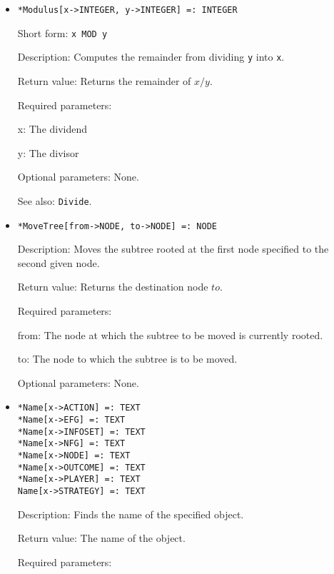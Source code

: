 \begin{itemize}
\item
\protect \large \begin{verbatim}
*Modulus[x->INTEGER, y->INTEGER] =: INTEGER
\end{verbatim}\normalsize

\bd
\item
[Short form:] \verb+x MOD y+
\item
[Description:] Computes the remainder from dividing \verb+y+ into \verb+x+.
\item
[Return value:] Returns the remainder of $x / y$.
\item
[Required parameters:]\hfil\null

\bd
\item
[x:] The dividend
\item
[y:] The divisor
\ed

\item
[Optional parameters:] None.
\item
[See also:] \verb+Divide+.
\ed


\item
\protect \large \begin{verbatim}
*MoveTree[from->NODE, to->NODE] =: NODE
\end{verbatim}\normalsize

\bd
\item
[Description:] Moves the subtree rooted at the first node specified to
the second given node.
\item
[Return value:] Returns the destination node $to$.
\item
[Required parameters:]\hfil\null
	  
\bd
\item
[from:] The node at which the subtree to be moved is currently rooted.
\item
[to:] The node to which the subtree is to be moved.
\ed

\item
[Optional parameters:] None.
\ed


\item
\protect \large \begin{verbatim}
*Name[x->ACTION] =: TEXT
*Name[x->EFG] =: TEXT
*Name[x->INFOSET] =: TEXT
*Name[x->NFG] =: TEXT
*Name[x->NODE] =: TEXT
*Name[x->OUTCOME] =: TEXT
*Name[x->PLAYER] =: TEXT
Name[x->STRATEGY] =: TEXT
\end{verbatim}\normalsize

\bd
\item
[Description:] Finds the name of the specified object.
\item
[Return value:] The name of the object.
\item
[Required parameters:]\hfil\null


\end{itemize}
